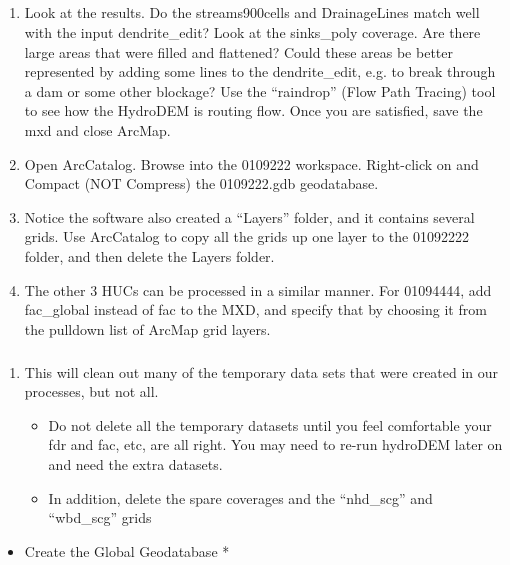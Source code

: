 \documentclass[letterpaper,10pt,english]{sphinxmanual}
\begin{document}
\subparagraph{}
\label{\detokenize{ex_2:examine-your-data}}\begin{enumerate}
\def\theenumi{\arabic{enumi}}
\def\labelenumi{\theenumi .}
\makeatletter\def\p@enumii{\p@enumi \theenumi .}\makeatother
\setcounter{enumi}{4}
\item {} 
Look at the results. Do the streams900cells and DrainageLines match well with the input dendrite\_edit? Look at the sinks\_poly coverage. Are there large areas that were filled and flattened? Could these areas be better represented by adding some lines to the dendrite\_edit, e.g. to break through a dam or some other blockage? Use the “raindrop” (Flow Path Tracing) tool to see how the HydroDEM is routing flow. Once you are satisfied, save the mxd and close ArcMap.

\item {} 
Open ArcCatalog.  Browse into the 0109222 workspace. Right-click on and Compact (NOT Compress) the 0109222.gdb geodatabase.

\item {} 
Notice the software also created a “Layers” folder, and it contains several grids. Use ArcCatalog to copy all the grids up one layer to the 01092222 folder, and then delete the Layers folder.

\item {} 
The other 3 HUCs can be processed in a similar manner. For 01094444, add fac\_global instead of fac to the MXD, and specify that by choosing it from the pulldown list of ArcMap grid layers.

\end{enumerate}


\subparagraph{}
\label{\detokenize{ex_2:run-the-cleanup-workspace-tool}}\begin{enumerate}
\def\theenumi{\arabic{enumi}}
\def\labelenumi{\theenumi .}
\makeatletter\def\p@enumii{\p@enumi \theenumi .}\makeatother
\setcounter{enumi}{8}
\item {} 
This will clean out many of the temporary data sets that were created in our processes, but not all.
\begin{itemize}
\item {} 
Do not delete all the temporary datasets until you feel comfortable your fdr and fac, etc, are all right. You may need to re-run hydroDEM later on and need the extra datasets.

\item {} 
In addition, delete the spare coverages and the “nhd\_scg” and “wbd\_scg” grids

\end{itemize}

\end{enumerate}
\begin{itemize}
\item {} 
Create the Global Geodatabase *

\end{itemize}
\end{document}
